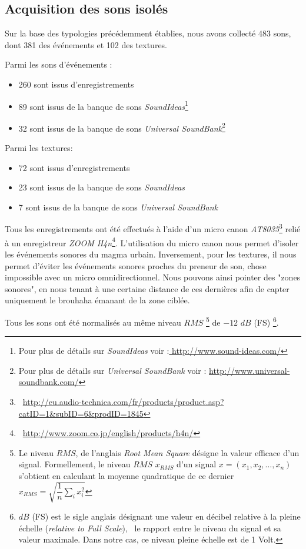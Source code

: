 \subsection{Acquisition des sons isolés}

Sur la base des typologies précédemment établies, nous avons collecté 483 sons, dont 381 des événements et 102 des textures.

Parmi les sons d'événements :

\begin{itemize}
\item 260 sont issus d’enregistrements
\item 89 sont issus de la banque de sons \emph{SoundIdeas}\footnote{Pour plus de détails sur \emph{SoundIdeas} voir :\url{ http://www.sound-ideas.com/}}
\item 32 sont issus de la banque de sons \emph{Universal SoundBank}\footnote{Pour plus de détails sur \emph{Universal SoundBank} voir : \url{http://www.universal-soundbank.com/}}
\end{itemize}

Parmi les textures:

\begin{itemize}
\item 72 sont issus d’enregistrements
\item 23 sont issus de la banque de sons \emph{SoundIdeas}
\item 7 sont issus de la banque de sons \emph{Universal SoundBank}
\end{itemize}

Tous les enregistrements ont été effectués à l’aide d'un micro canon \emph{AT8035}\footnote{\Cf~\url{http://eu.audio-technica.com/fr/products/product.asp?catID=1&subID=6&prodID=1845}} relié à un enregistreur \emph{ZOOM H4n}\footnote{\Cf~\url{http://www.zoom.co.jp/english/products/h4n/}}. L’utilisation du micro canon nous permet d’isoler les événements sonores du magma urbain. Inversement, pour les textures, il nous permet d’éviter les événements sonores proches du preneur de son, chose impossible avec un micro omnidirectionnel. Nous pouvons ainsi pointer des "zones sonores", en nous tenant à une certaine distance de ces dernières afin de capter uniquement le brouhaha émanant de la zone ciblée.

Tous les sons ont été normalisés au même niveau $RMS$ \footnote{Le niveau $RMS$, de l'anglais \emph{Root Mean Square} désigne la valeur efficace d'un signal. Formellement, le niveau $RMS$ $x_{RMS}$ d'un signal $x=(x_1,x_2,\ldots,x_n)$ s'obtient en calculant la moyenne quadratique de ce dernier $x_{RMS}=\sqrt{\dfrac{1}{n}\sum\limits_{i} x_i^2}$} de $-12$ $dB$ (FS) \footnote{$dB$ (FS) est le sigle anglais désignant une valeur en décibel relative à la pleine échelle (\emph{relative to Full Scale}), \ie~le rapport entre le niveau du signal et sa valeur maximale. Dans notre cas, ce niveau pleine échelle est de 1 Volt.}.

